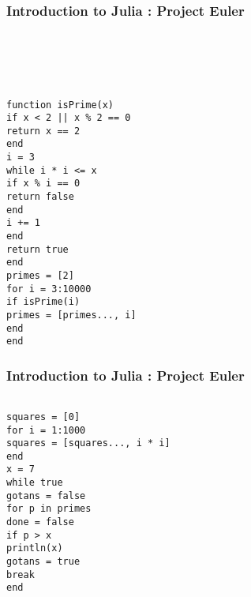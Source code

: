 



\begin{frame}[fragile]

\frametitle{Introduction to Julia : Project Euler}

\begin{verbatim}





function isPrime(x)
if x < 2 || x % 2 == 0
return x == 2
end
i = 3
while i * i <= x
if x % i == 0
return false
end
i += 1
end
return true
end
primes = [2]
for i = 3:10000
if isPrime(i)
primes = [primes..., i]
end
end

\end{verbatim}

\end{frame}


\begin{frame}[fragile]

\frametitle{Introduction to Julia : Project Euler}

\begin{verbatim}

squares = [0]
for i = 1:1000
squares = [squares..., i * i]
end
x = 7
while true
gotans = false
for p in primes
done = false
if p > x
println(x)
gotans = true
break
end
\end{verbatim}

\end{frame}

